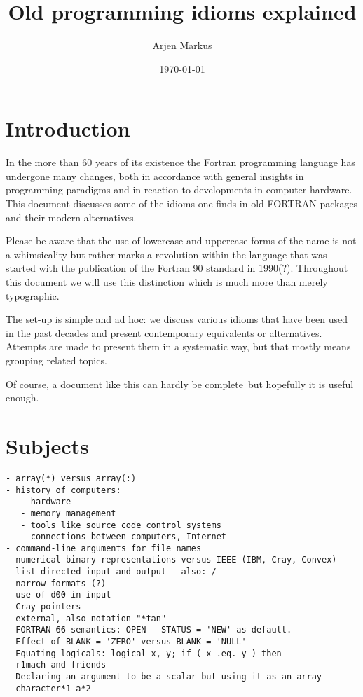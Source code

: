 \documentclass{article}
\date{\today}
\author{Arjen Markus}
\title{Old programming idioms explained}
\begin{document}
\maketitle

\tableofcontents
\newpage

\section{Introduction}
In the more than 60 years of its existence the Fortran programming
language has undergone many changes, both in accordance with general insights
in programming paradigms and in reaction to developments in computer hardware.
This document discusses some of the idioms one finds in old FORTRAN packages
and their modern alternatives.

Please be aware that the use of lowercase and uppercase forms of the name is
not a whimsicality but rather marks a revolution within the language that was
started with the publication of the Fortran 90 standard in 1990(?). Throughout
this document we will use this distinction which is much more than merely
typographic.

The set-up is simple and ad hoc: we discuss various idioms that have been
used in the past decades and present contemporary equivalents or alternatives.
Attempts are made to present them in a systematic way, but that mostly means grouping
related topics.

Of course, a document like this can hardly be complete\, but hopefully it is
useful enough.











\section{Subjects}
\begin{verbatim}
- array(*) versus array(:)
- history of computers:
   - hardware
   - memory management
   - tools like source code control systems
   - connections between computers, Internet
- command-line arguments for file names
- numerical binary representations versus IEEE (IBM, Cray, Convex)
- list-directed input and output - also: /
- narrow formats (?)
- use of d00 in input
- Cray pointers
- external, also notation "*tan"
- FORTRAN 66 semantics: OPEN - STATUS = 'NEW' as default.
- Effect of BLANK = 'ZERO' versus BLANK = 'NULL'
- Equating logicals: logical x, y; if ( x .eq. y ) then
- r1mach and friends
- Declaring an argument to be a scalar but using it as an array
- character*1 a*2
\end{verbatim}
\end{document}
